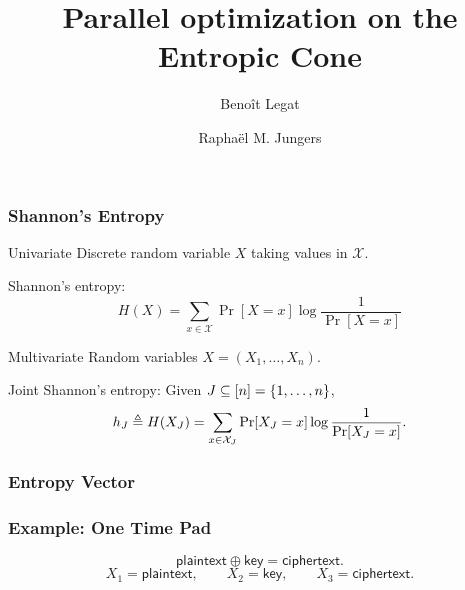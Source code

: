 \documentclass[10pt,svgnames,usenames,table]{beamer}
\title{Parallel optimization on the Entropic Cone}
\date{}
\author{Beno\^it Legat \and Rapha\"el M. Jungers}
\institute{Universit\'e catholique de Louvain (UCL)}
\begin{document}
  \maketitle

  \begin{frame}
    \frametitle{Shannon's Entropy}
    \begin{block}{Univariate}
      Discrete random variable $X$ taking values
      in $\mathcal{X}$.

      Shannon's entropy:
      \[ H(X) = \sum_{x \in \mathcal{X}} \Pr[X = x] \log\frac{1}{\Pr[X = x]} \]
    \end{block}
    \begin{block}{Multivariate}
      Random variables $X = (X_1, \ldots, X_n)$.

      Joint Shannon's entropy: Given $J \subseteq [n] = \{1, \ldots, n\}$,
      \[ h_{J} \triangleq H(X_J) = \sum_{x \in \mathcal{X}_J} \Pr[X_J = x] \log \frac{1}{\Pr[X_J = x]}. \]
    \end{block}
  \end{frame}

  \begin{frame}
    \frametitle{Entropy Vector}
  \end{frame}

  \begin{frame}
    \frametitle{Example: One Time Pad}
    \[ \mathsf{plaintext} \oplus \mathsf{key} = \mathsf{ciphertext}. \]
    \[ X_1 = \mathsf{plaintext}, \qquad X_2 = \mathsf{key}, \qquad X_3 = \mathsf{ciphertext}. \]
  \end{frame}
\end{document}
